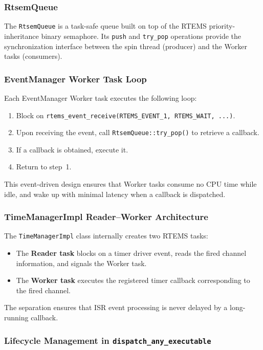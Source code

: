\subsubsection{RtsemQueue}

The \texttt{RtsemQueue} is a task-safe queue built on top of the RTEMS priority-inheritance binary semaphore.  Its \texttt{push} and \texttt{try\_pop} operations provide the synchronization interface between the spin thread (producer) and the Worker tasks (consumers).

\subsubsection{EventManager Worker Task Loop}

Each EventManager Worker task executes the following loop:
\begin{enumerate}
    \item Block on \texttt{rtems\_event\_receive(RTEMS\_EVENT\_1, RTEMS\_WAIT, ...)}.
    \item Upon receiving the event, call \texttt{RtsemQueue::try\_pop()} to retrieve a callback.
    \item If a callback is obtained, execute it.
    \item Return to step~1.
\end{enumerate}
This event-driven design ensures that Worker tasks consume no CPU time while idle, and wake up with minimal latency when a callback is dispatched.

\subsubsection{TimeManagerImpl Reader--Worker Architecture}

The \texttt{TimeManagerImpl} class internally creates two RTEMS tasks:
\begin{itemize}
    \item The \textbf{Reader task} blocks on a timer driver event, reads the fired channel information, and signals the Worker task.
    \item The \textbf{Worker task} executes the registered timer callback corresponding to the fired channel.
\end{itemize}
The separation ensures that ISR event processing is never delayed by a long-running callback.

\subsubsection{Lifecycle Management in \texttt{dispatch\_any\_executable}}

